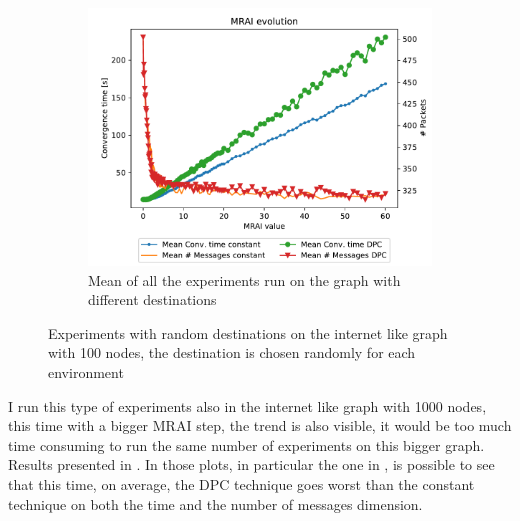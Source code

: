 \documentclass[10pt,conference,letterpaper]{IEEEtran}
\newcommand{\figwidth}{0.78}
\newcommand{\figvspace}{-1.5em}
\begin{document}
\begin{figure}[tb]
	\begin{subfigure}{\columnwidth}
		\centering
		\includegraphics[width=\figwidth\columnwidth]{images/internet_like/S_AW/different_destinations_mean}
		\caption{Mean of all the experiments run on the graph with different destinations}
		\label{fig:s_aw_different_desintations_mean}
		\qquad
	\end{subfigure}

	\caption{Experiments with random destinations on the internet like graph with
		\num{100} nodes, the destination is chosen randomly for each environment}
	\label{fig:s_aw_different_desintations}
	\vspace{\figvspace}
\end{figure}

I run this type of experiments also in the internet like graph with \num{1000}
nodes, this time with a bigger \ac{MRAI} step, the trend is also visible, it 
would be too much time consuming to run the same number of experiments on this
bigger graph.
Results presented in .
In those plots, in particular the one in ,
is possible to see that this time, on average, the \ac{DPC} technique goes
worst than the constant technique on both the time and the number of messages dimension.
\end{document}
